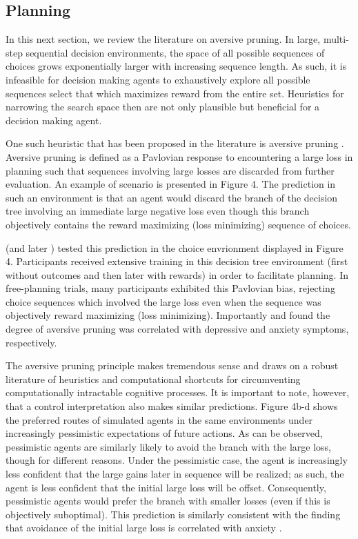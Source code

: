 \documentclass[11pt]{article} %
\begin{document}
\subsection{Planning}

In this next section, we review the literature on aversive pruning. In large,
multi-step sequential decision environments, the space of all possible sequences
of choices grows exponentially larger with increasing sequence length. As such,
it is infeasible for decision making agents to exhaustively explore all possible
sequences select that which maximizes reward from the entire set. Heuristics for
narrowing the search space then are not only plausible but beneficial for a
decision making agent.

One such heuristic that has been proposed in the literature is aversive pruning
\citep{Huys2012}. Aversive pruning is defined as a Pavlovian response to encountering
a large loss in planning such that sequences involving large losses are discarded
from further evaluation. An example of scenario is presented in Figure 4. The prediction
in such an environment is that an agent would discard the branch of the decision
tree involving an immediate large negative loss even though this branch objectively
contains the reward maximizing (loss minimizing) sequence of choices.

\cite{Huys2012} (and later \cite{Lally2017}) tested this prediction in the
choice envrionment displayed in Figure 4. Participants received extensive training
in this decision tree environment (first without outcomes and then later with
rewards) in order to facilitate planning. In free-planning trials, many participants
exhibited this Pavlovian bias, rejecting choice sequences which involved the large
loss even when the sequence was objectively reward maximizing (loss minimizing).
Importantly \cite{Huys2012} and \cite{Lally2017} found the degree of aversive
pruning was correlated with depressive and anxiety symptoms, respectively.

The aversive pruning principle makes tremendous sense and draws on a robust literature
of heuristics and computational shortcuts for circumventing computationally intractable
cognitive processes. It is important to note, however, that a control interpretation
also makes similar predictions. Figure 4b-d shows the preferred routes of simulated
agents in the same environments under increasingly pessimistic expectations of
future actions. As can be observed, pessimistic agents are similarly likely to avoid
the branch with the large loss, though for different reasons. Under the pessimistic case,
the agent is increasingly less confident that the large gains later in
sequence will be realized; as such, the agent is less confident that the initial
large loss will be offset. Consequently, pessimistic agents would prefer the branch
with smaller losses (even if this is objectively suboptimal). This prediction
is similarly consistent with the finding that avoidance of the initial large loss
is correlated with anxiety \cite{Lally2017}.
\end{document}
